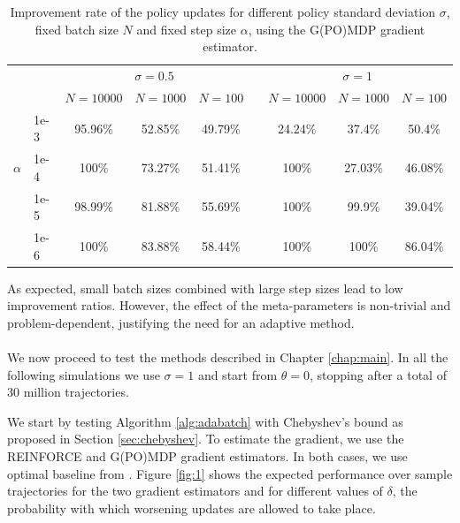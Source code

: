 \begin{table}[H]
\label{tab:1}
\caption{Improvement rate of the policy updates for different policy standard deviation $\sigma$, fixed batch size $N$ and fixed step size $\alpha$, using the G(PO)MDP gradient estimator.}
\centering
\begin{adjustbox}{center}
\begin{tabular}{@{}llccccccc@{}} 
\toprule
\phantom{abc} & \phantom{abc} & \multicolumn{3}{c}{$\sigma=0.5$} & \phantom{abc} & \multicolumn{3}{c}{$\sigma=1$} \\
\cmidrule{3-5} \cmidrule{7-9}
\phantom{abc} & \phantom{abc} & $N=10000$ & $N=1000$ & $N=100$ & \phantom{abc} & $N=10000$ & $N=1000$ & $N=100$
\\\cmidrule{3-9}
\phantom{abc} & 1e-3 & 95.96\% & 52.85\% & 49.79\% & \phantom{abc} & 24.24\% & 37.4\% & 50.4\% \\ 
 $\alpha$	  & 1e-4 & 100\% & 73.27\% & 51.41\% & \phantom{abc} & 100\% & 27.03\% & 46.08\% \\
\phantom{abc} & 1e-5 & 98.99\% & 81.88\% & 55.69\% & \phantom{abc} & 100\% & 99.9\% & 39.04\%\\
\phantom{abc} & 1e-6 & 100\% & 83.88\% & 58.44\% & \phantom{abc} & 100\% & 100\% & 86.04\% \\
\bottomrule
\end{tabular}
\end{adjustbox}
\end{table}

As expected, small batch sizes combined with large step sizes lead to low improvement ratios. However, the effect of the meta-parameters is non-trivial and problem-dependent, justifying the need for an adaptive method.  
\paragraph{}
We now proceed to test the methods described in Chapter \ref{chap:main}. 
In all the following simulations we use $\sigma = 1$ and start from $\theta=0$, stopping after a total of 30 million trajectories.

We start by testing Algorithm \ref{alg:adabatch} with Chebyshev's bound as proposed in Section \ref{sec:chebyshev}. To estimate the gradient, we use the REINFORCE and G(PO)MDP gradient estimators. In both cases, we use optimal baseline from \cite{4867}.
Figure \ref{fig:1} shows the expected performance over sample trajectories for the two gradient estimators and for different values of $\delta$, the probability with which worsening updates are allowed to take place. 



